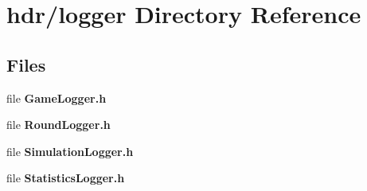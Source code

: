 \section{hdr/logger Directory Reference}
\label{dir_58dbc08ea8e83f8fdfc4ae7f7f42fbee}
\subsection*{Files}
\begin{DoxyCompactItemize}
\item 
file {\bfseries Game\-Logger.\-h}
\item 
file {\bfseries Round\-Logger.\-h}
\item 
file {\bfseries Simulation\-Logger.\-h}
\item 
file {\bfseries Statistics\-Logger.\-h}
\end{DoxyCompactItemize}
